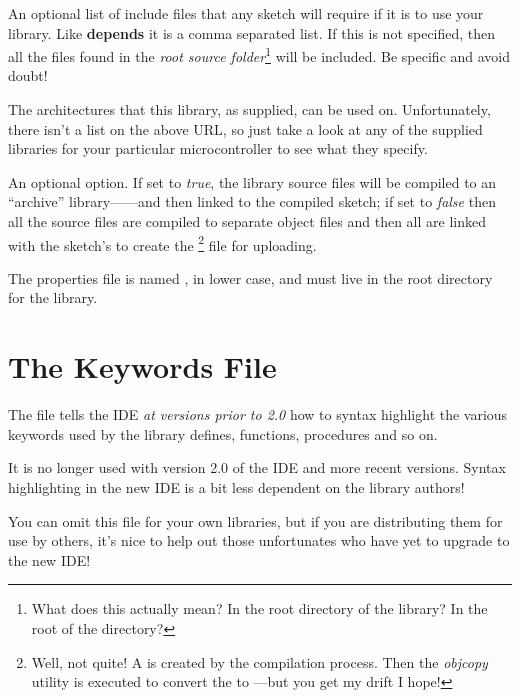\begin{description}
    \item[\textbf{includes}] An optional list of include files that any sketch will require if it is to use your library. Like \textbf{depends} it is a comma separated list. If this is not specified, then all the  files found in the \emph{root source folder}\footnote{What does this actually mean? In the root directory of the library? In the root of the  directory?} will be included. Be specific and avoid doubt!
    \item[\textbf{architectures}] The architectures that this library, as supplied, can be used on. Unfortunately, there isn't a list on the above URL, so just take a look at any of the supplied libraries for your particular microcontroller to see what they specify.
    \item[\textbf{dot\_a\_linkage}] An optional option. If set to \emph{true}, the library source files will be compiled to an ``archive'' library------and then linked to the compiled sketch; if set to \emph{false} then all the source files are compiled to separate  object files and then all are linked with the sketch's  to create the \footnote{Well, not quite! A  is created by the compilation process. Then the \emph{objcopy} utility is executed to convert the  to ---but you get my drift I hope!} file for uploading.
\end{description}

The properties file is named , in lower case, and must live in the root directory for the library.

\section{The Keywords File}

The  file tells the IDE \emph{at versions prior to 2.0} how to syntax highlight the various keywords used by the library defines, functions, procedures and so on.

It is no longer used with version 2.0 of the IDE and more recent versions. Syntax highlighting in the new IDE is a bit less dependent on the library authors!

You can omit this file for your own libraries, but if you are distributing them for use by others, it's nice to help out those unfortunates who have yet to upgrade to the new IDE!

